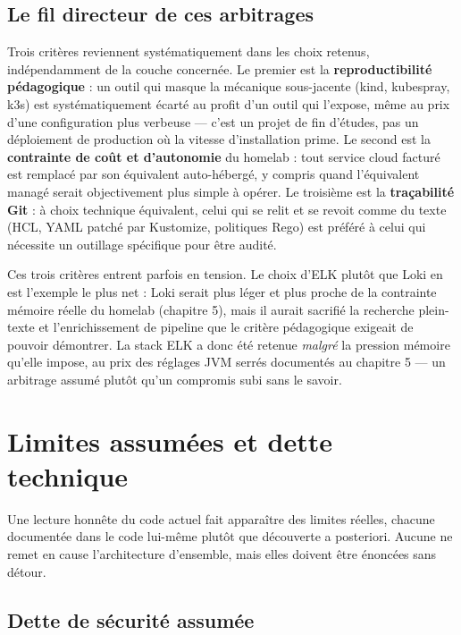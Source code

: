 \documentclass[12pt,a4paper,twoside,openright]{report}
\begin{document}
\section{Le fil directeur de ces arbitrages}

Trois critères reviennent systématiquement dans les choix retenus, indépendamment
de la couche concernée. Le premier est la \textbf{reproductibilité pédagogique} :
un outil qui masque la mécanique sous-jacente (kind, kubespray, k3s) est
systématiquement écarté au profit d'un outil qui l'expose, même au prix d'une
configuration plus verbeuse — c'est un projet de fin d'études, pas un déploiement
de production où la vitesse d'installation prime. Le second est la
\textbf{contrainte de coût et d'autonomie} du homelab : tout service cloud
facturé est remplacé par son équivalent auto-hébergé, y compris quand
l'équivalent managé serait objectivement plus simple à opérer. Le troisième est la
\textbf{traçabilité Git} : à choix technique équivalent, celui qui se relit et se
revoit comme du texte (HCL, YAML patché par Kustomize, politiques Rego) est
préféré à celui qui nécessite un outillage spécifique pour être audité.

Ces trois critères entrent parfois en tension. Le choix d'ELK plutôt que Loki en est
l'exemple le plus net : Loki serait plus léger et plus proche de la contrainte
mémoire réelle du homelab (chapitre 5), mais il aurait sacrifié la recherche
plein-texte et l'enrichissement de pipeline que le critère pédagogique exigeait de
pouvoir démontrer. La stack ELK a donc été retenue \emph{malgré} la pression
mémoire qu'elle impose, au prix des réglages JVM serrés documentés au chapitre 5 —
un arbitrage assumé plutôt qu'un compromis subi sans le savoir.

\clearpage
\chapter{Limites assumées et dette technique}

Une lecture honnête du code actuel fait apparaître des limites réelles, chacune
documentée dans le code lui-même plutôt que découverte a posteriori. Aucune ne
remet en cause l'architecture d'ensemble, mais elles doivent être énoncées sans
détour.

\section{Dette de sécurité assumée}
\end{document}
